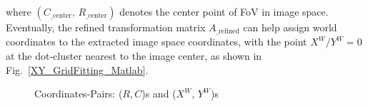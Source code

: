 \noindent
where \((C_{\text{\_center}}, \, R_{\text{\_center}})\) denotes the center point of FoV in image space. Eventually, the refined transformation matrix $A_{\text{\_refined}}$ can help assign world coordinates to the extracted image space coordinates, with the point \(X^W/Y^W=0\) at the dot-cluster nearest to the image center, as shown in Fig.~\ref{XY_GridFitting_Matlab}.
%
 \begin{figure}[t]
\hspace*{-0.3cm}
\centering
{}
{}
%
\caption{Coordinates-Pairs: (\(R, C\))s and (\(X^W\), \(Y^W\))s}
\label{Grid_Fitting}
\end{figure}%

